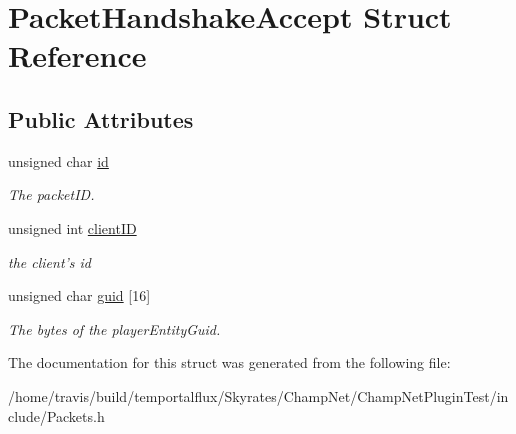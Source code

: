 \hypertarget{struct_packet_handshake_accept}{\section{Packet\-Handshake\-Accept Struct Reference}
\label{struct_packet_handshake_accept}
}
\subsection*{Public Attributes}
\begin{DoxyCompactItemize}
\item 
\hypertarget{struct_packet_handshake_accept_a7f13805e14407843be3160edcec2d351}{unsigned char \hyperlink{struct_packet_handshake_accept_a7f13805e14407843be3160edcec2d351}{id}}\label{struct_packet_handshake_accept_a7f13805e14407843be3160edcec2d351}

\begin{DoxyCompactList}\small\item\em The packet\-I\-D. \end{DoxyCompactList}\item 
\hypertarget{struct_packet_handshake_accept_abf4588bf69fd1b2519cccba3a3d8825c}{unsigned int \hyperlink{struct_packet_handshake_accept_abf4588bf69fd1b2519cccba3a3d8825c}{client\-I\-D}}\label{struct_packet_handshake_accept_abf4588bf69fd1b2519cccba3a3d8825c}

\begin{DoxyCompactList}\small\item\em the client's id \end{DoxyCompactList}\item 
\hypertarget{struct_packet_handshake_accept_a2c2a0d1d462ad7dd06c2115315647b63}{unsigned char \hyperlink{struct_packet_handshake_accept_a2c2a0d1d462ad7dd06c2115315647b63}{guid} \mbox{[}16\mbox{]}}\label{struct_packet_handshake_accept_a2c2a0d1d462ad7dd06c2115315647b63}

\begin{DoxyCompactList}\small\item\em The bytes of the player\-Entity\-Guid. \end{DoxyCompactList}\end{DoxyCompactItemize}


The documentation for this struct was generated from the following file\-:\begin{DoxyCompactItemize}
\item 
/home/travis/build/temportalflux/\-Skyrates/\-Champ\-Net/\-Champ\-Net\-Plugin\-Test/include/Packets.\-h\end{DoxyCompactItemize}
